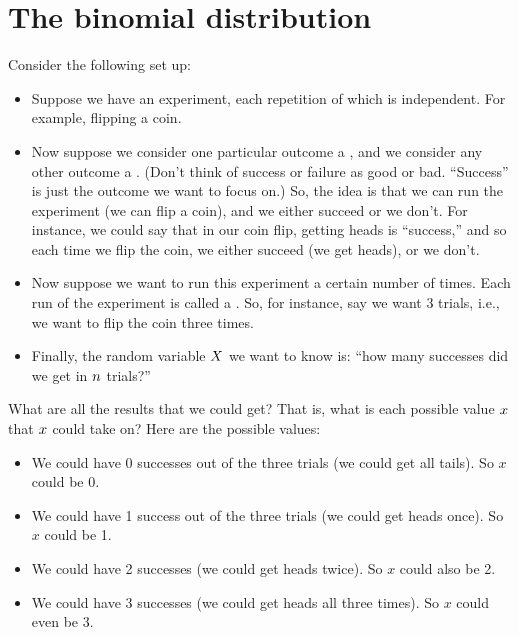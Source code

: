 \documentclass[../../../main.tex]{subfiles}
\begin{document}
\chapter{The binomial distribution}

Consider the following set up:

\begin{itemize}
  \item Suppose we have an experiment, each repetition of which is independent. For example, flipping a coin. 
  \item Now suppose we consider one particular outcome a , and we consider any other outcome a . (Don't think of success or failure as good or bad. ``Success'' is just the outcome we want to focus on.) So, the idea is that we can run the experiment (we can flip a coin), and we either succeed or we don't. For instance, we could say that in our coin flip, getting heads is ``success,'' and so each time we flip the coin, we either succeed (we get heads), or we don't. 
  \item Now suppose we want to run this experiment a certain number of times. Each run of the experiment is called a . So, for instance, say we want 3 trials, i.e., we want to flip the coin three times.
  \item Finally, the random variable $\RandVar/$ we want to know is: ``how many successes did we get in $\numTrials/$ trials?''
\end{itemize}

\noindent
What are all the results that we could get? That is, what is each possible value $\RandVarVal/$ that $\RandVarVal/$ could take on? Here are the possible values:

\begin{itemize}
  \item We could have 0 successes out of the three trials (we could get all tails). So $x$ could be 0.
  \item We could have 1 success out of the three trials (we could get heads once). So $x$ could be 1.
  \item We could have 2 successes (we could get heads twice). So $x$ could also be 2.
  \item We could have 3 successes (we could get heads all three times). So $x$ could even be 3.
\end{itemize}
\end{document}
